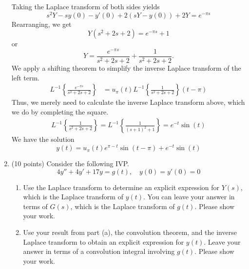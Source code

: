 \documentclass[11pt, titlepage]{article}
\begin{document}
\begin{enumerate}
            \begin{solution}
                Taking the Laplace transform of both sides yields
                \[
                    s^2Y - sy(0) - y'(0) + 2(sY - y(0)) + 2Y = e^{-\pi s}
                \] 
                Rearranging, we get
                \[
                    Y(s^2 + 2s + 2) = e^{-\pi s} + 1
                \] 
                or
                \[
                Y = \frac{e^{-\pi s}}{s^2 + 2s + 2} + \frac{1}{s^2 + 2s + 2}.
                \] 
                We apply a shifting theorem to simplify the inverse Laplace
                transform of the left term.
                \begin{align*}
                    L^{-1} \left\{ \frac{e^{-\pi s}}{s^2 + 2s + 2} \right\} &=
                    u_\pi(t) L^{-1} \left\{ \frac{1}{s^2 + 2s + 2}
                    \right\} (t - \pi)
                \end{align*}
                Thus, we merely need to calculate the inverse Laplace transform
                above, which we do by completing the square.
                \begin{gather*}
                    L^{-1} \left\{ \frac{1}{s^2 + 2s + 2} \right\} = L^{-1}
                    \left\{ \frac{1}{(s + 1)^2 + 1} \right\} = e^{-t} 
                    \sin(t)
                \end{gather*}
                We have the solution
                \[
                    y(t) = u_\pi (t) e^{\pi - t} \sin(t - \pi) + e^{-t}\sin(t)
                \] 
            \end{solution}

        \pagebreak

        \item (10 points) Consider the following IVP.
            \[
                4y'' + 4y' + 17y = g(t), \quad y(0) = y'(0) = 0
            \] 
            \begin{enumerate}[label={(\alph*)}]
                \item Use the Laplace transform to determine an explicit
                    expression for $Y(s)$, which is the Laplace transform of
                    $y(t)$. You can leave your answer in terms of $G(s)$, which
                    is the Laplace transform of $g(t)$. Please show your work.
                \item Use your result from part (a), the convolution theorem,
                    and the inverse Laplace transform to obtain an explicit
                    expression for $y(t)$. Leave your answer in terms of a
                    convolution integral involving $g(t)$. Please show your
                    work.
            \end{enumerate}


\end{enumerate}
\end{document}
